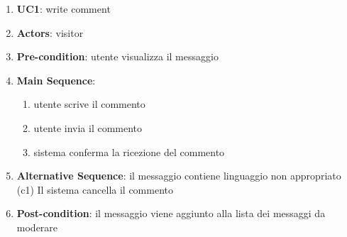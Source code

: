 \documentclass{article}
\begin{document}
\begin{enumerate}
    \renewcommand{\labelenumi}{-}
    \item \textbf{UC1}: write comment
    \item \textbf{Actors}: visitor 
    \item \textbf{Pre-condition}: utente visualizza il messaggio
    \item \textbf{Main Sequence}:  
    \begin{enumerate}
        \item utente scrive il commento
        \item utente invia il commento
        \item sistema conferma la ricezione del commento
    \end{enumerate}
    \item \textbf{Alternative Sequence}: il messaggio contiene linguaggio non appropriato\\
    (c1) Il sistema cancella il commento
    \item \textbf{Post-condition}: il messaggio viene aggiunto alla lista dei messaggi da moderare
\end{enumerate}
\end{document}
